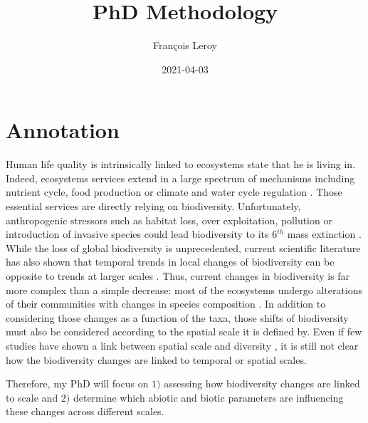\documentclass[
  12pt,
  oneside]{report}
\title{PhD Methodology}
\author{François Leroy}
\date{2021-04-03}
\begin{document}
\maketitle

\cleardoublepage 
{}

{
\setcounter{tocdepth}{1}
\tableofcontents
}
\listoffigures
\listoftables
{}


\cleardoublepage 
{}


\hypertarget{annotation}{%
\chapter{Annotation}\label{annotation}}

Human life quality is intrinsically linked to ecosystems state that he is living in. Indeed, ecosystems services extend in a large spectrum of mechanisms including nutrient cycle, food production or climate and water cycle regulation \autocite{pereira_global_2012}. Those essential services are directly relying on biodiversity. Unfortunately, anthropogenic stressors such as habitat loss, over exploitation, pollution or introduction of invasive species could lead biodiversity to its 6\(^{th}\) mass extinction \autocite{barnosky_has_2011}. While the loss of global biodiversity is unprecedented, current scientific literature has also shown that temporal trends in local changes of biodiversity can be opposite to trends at larger scales \autocite{chase_species_2019}. Thus, current changes in biodiversity is far more complex than a simple decrease: most of the ecosystems undergo alterations of their communities with changes in species composition \autocite{blowes_geography_2019,dornelas_assemblage_2014}. In addition to considering those changes as a function of the taxa, those shifts of biodiversity must also be considered according to the spatial scale it is defined by. Even if few studies have shown a link between spatial scale and diversity \autocite{Keil_biogeo_2012}, it is still not clear how the biodiversity changes are linked to temporal or spatial scales.

Therefore, my PhD will focus on \(1)\) assessing how biodiversity changes are linked to scale and \(2)\) determine which abiotic and biotic parameters are influencing these changes across different scales.
\end{document}

